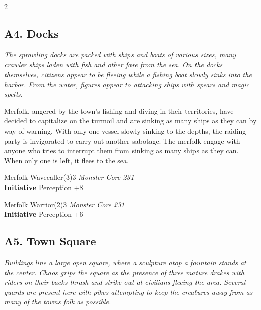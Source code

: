 \begin{multicols}{2}
\subsection{A4. Docks}

\begin{pf-parchment}[\textcolor{title1}{Description}]
  \textcolor{title1}{\textit{The sprawling docks are packed with ships and boats of various sizes, many crawler ships laden with fish and other fare from the sea. On the docks themselves, citizens appear to be fleeing while a fishing boat slowly sinks into the harbor. From the water, figures appear to attacking ships with spears and magic spells.}}
\end{pf-parchment}

Merfolk, angered by the town's fishing and diving in their territories, have decided to capitalize on the turmoil and are sinking as many ships as they can by way of warning. With only one vessel slowly sinking to the depths, the raiding party is invigorated to carry out another sabotage. The merfolk engage with anyone who tries to interrupt them from sinking as many ships as they can. When only one is left, it flees to the sea.

  \begin{creaturebox}{Merfolk Wavecaller(3)}{3}
    \textit{Monster Core 231}\\
    \textbf{Initiative} Perception +8
  \end{creaturebox}

  \begin{creaturebox}{Merfolk Warrior(2)}{3}
    \textit{Monster Core 231}\\
    \textbf{Initiative} Perception +6
  \end{creaturebox}

\subsection{A5. Town Square}

\begin{pf-parchment}[\textcolor{title1}{Description}]
  \textcolor{title1}{\textit{Buildings line a large open square, where a sculpture atop a fountain stands at the center. Chaos grips the square as the presence of three mature drakes with riders on their backs thrash and strike out at civilians fleeing the area. Several guards are present here with pikes attempting to keep the creatures away from as many of the towns folk as possible.}}
\end{pf-parchment}


\end{multicols}
